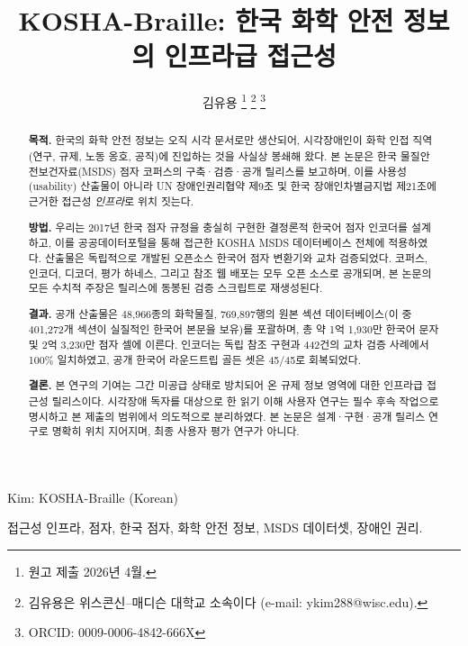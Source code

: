\documentclass[journal]{IEEEtran}
\begin{document}
\title{KOSHA-Braille: 한국 화학 안전 정보의 인프라급 접근성}

\author{김유용
\thanks{원고 제출 2026년 4월.}
\thanks{김유용은 위스콘신--매디슨 대학교 소속이다 (e-mail: ykim288@wisc.edu).}
\thanks{ORCID: 0009-0006-4842-666X}
}

{Kim: KOSHA-Braille (Korean)}

\begin{abstract}
\textbf{목적.} 한국의 화학 안전 정보는 오직 시각 문서로만 생산되어, 시각장애인이 화학 인접 직역(연구, 규제, 노동 옹호, 공직)에 진입하는 것을 사실상 봉쇄해 왔다. 본 논문은 한국 물질안전보건자료(MSDS) 점자 코퍼스의 구축·검증·공개 릴리스를 보고하며, 이를 사용성(usability) 산출물이 아니라 UN 장애인권리협약 제9조 및 한국 장애인차별금지법 제21조에 근거한 접근성 \emph{인프라}로 위치 짓는다.

\textbf{방법.} 우리는 2017년 한국 점자 규정을 충실히 구현한 결정론적 한국어 점자 인코더를 설계하고, 이를 공공데이터포털을 통해 접근한 KOSHA MSDS 데이터베이스 전체에 적용하였다. 산출물은 독립적으로 개발된 오픈소스 한국어 점자 변환기와 교차 검증되었다. 코퍼스, 인코더, 디코더, 평가 하네스, 그리고 참조 웹 배포는 모두 오픈 소스로 공개되며, 본 논문의 모든 수치적 주장은 릴리스에 동봉된 검증 스크립트로 재생성된다.

\textbf{결과.} 공개 산출물은 48{,}966종의 화학물질, 769{,}897행의 원본 섹션 데이터베이스(이 중 401{,}272개 섹션이 실질적인 한국어 본문을 보유)를 포괄하며, 총 약 1억 1{,}930만 한국어 문자 및 2억 3{,}230만 점자 셀에 이른다. 인코더는 독립 참조 구현과 442건의 교차 검증 사례에서 100\% 일치하였고, 공개 한국어 라운드트립 골든 셋은 45/45로 회복되었다.

\textbf{결론.} 본 연구의 기여는 그간 미공급 상태로 방치되어 온 규제 정보 영역에 대한 인프라급 접근성 릴리스이다. 시각장애 독자를 대상으로 한 읽기 이해 사용자 연구는 필수 후속 작업으로 명시하고 본 제출의 범위에서 의도적으로 분리하였다. 본 논문은 설계·구현·공개 릴리스 연구로 명확히 위치 지어지며, 최종 사용자 평가 연구가 아니다.
\end{abstract}

\begin{keywords}
접근성 인프라, 점자, 한국 점자, 화학 안전 정보, MSDS 데이터셋, 장애인 권리.
\end{keywords}

\titlepgskip=-15pt

\maketitle
\end{document}
